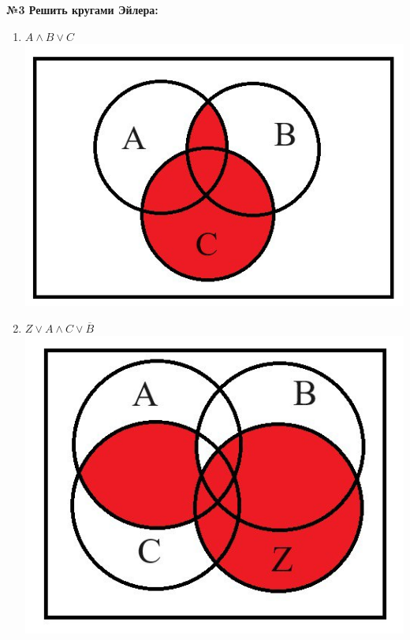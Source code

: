     \begin{center}
        \textbf{№3 Решить кругами Эйлера:}
    \end{center}

    \begin{minipage}[t]{0.4\textwidth}
        \centering
        \begin{enumerate}
            \item $A \wedge B \vee C$\\
            \includegraphics[width=1\linewidth]{images/im1}
        \end{enumerate}
    \end{minipage}
    \begin{minipage}[t]{0.4\textwidth}
        \centering
        \begin{enumerate}
            \setcounter{enumi}{1}
            \item $Z \vee A \wedge C \vee \overline B$\\
            \includegraphics[width=1\linewidth]{images/im2}

        \end{enumerate}
    \end{minipage}

